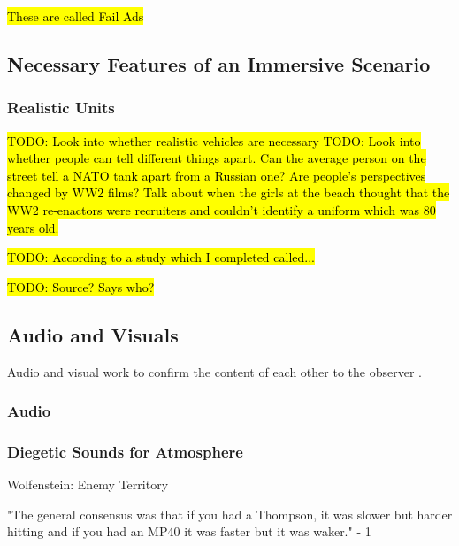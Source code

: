 \documentclass{article}
\begin{document}
\hl{These are called Fail Ads} 

\subsection{Necessary Features of an Immersive Scenario}

\subsubsection{Realistic Units}

\hl{TODO: Look into whether realistic vehicles are necessary
TODO: Look into whether people can tell different things apart. Can the average person on the street tell a NATO tank apart from a Russian one? Are people's perspectives changed by WW2 films? Talk about when the girls at the beach thought that the WW2 re-enactors were recruiters and couldn't identify a uniform which was 80 years old.}

\hl{TODO: According to a study which I completed called... }

\hl{TODO: Source? Says who?}

\subsection{Audio and Visuals}

Audio and visual work to confirm the content of each other to the observer \cite{diegeticSounds1}. 

\subsubsection{Audio}

\subsubsection{Diegetic Sounds for Atmosphere}

 \cite{diegeticSounds1}



Wolfenstein: Enemy Territory


"The general consensus was that if you had a Thompson, it was slower but harder hitting and if you had an MP40 it was faster but it was waker." - 1
\end{document}
